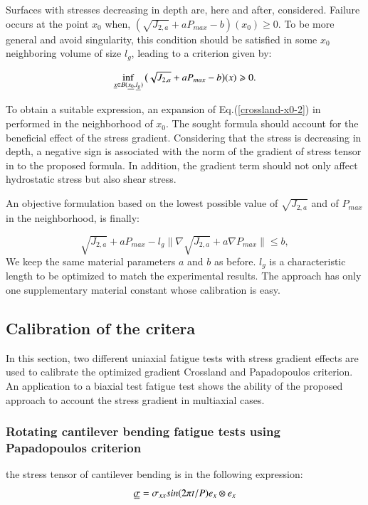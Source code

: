 \documentclass[3p,times,procedia,number]{elsarticle}
\begin{document}
Surfaces with stresses decreasing in depth are, here and after, considered. Failure occurs at the point $x_0$ when,  $(\sqrt{J_{2,a}}+aP_{max}-b)(x_0)\geqslant 0 $. To be more general and avoid singularity, this condition should be satisfied in some $x_0$ neighboring volume of size $l_g$, leading to a criterion given by:

\begin{equation}
\inf\limits_{\uline{x}\in B(\uline{x_0},\uline{l_g})}\big(\sqrt{J_{2,a}}+aP_{max}-b\big)(x)\geqslant 0 .
\label{crossland-x0-2}
\end{equation}

To obtain a suitable expression, an expansion of Eq.(\ref{crossland-x0-2}) in performed in the neighborhood of ${x_0}$. The sought formula should account for the beneficial effect of the stress gradient. Considering that the stress is decreasing in depth, a negative sign is associated with the norm of the gradient of stress tensor in to the proposed formula. In addition, the gradient term should not only affect hydrostatic stress but also shear stress.

An objective formulation based on the lowest possible value of $\sqrt{J_{2,a}}$ and of $P_{max}$ in the neighborhood, is finally:

\begin{equation}
\sqrt{J_{2,a}}+aP_{max}-l_g\parallel{\nabla\sqrt{J_{2,a}}}+a\nabla{P_{max}}\parallel\leqslant b ,
\label{modified Crossland}
\end{equation}
We keep the same material parameters $a$ and $b$ as before. $l_g$ is a characteristic length to be optimized to match the experimental results. The approach has only one supplementary material constant whose calibration is easy.


\subsection{Calibration of the critera}

In this section, two different uniaxial fatigue tests with stress gradient effects are used to calibrate the optimized gradient Crossland  and Papadopoulos criterion. An application to a biaxial test fatigue test shows the ability of the proposed approach to account the stress gradient in multiaxial cases. 
\subsubsection{Rotating cantilever bending fatigue tests using Papadopoulos criterion}  
the stress tensor of cantilever bending is in the following expression:
$$\uuline{\sigma}=\sigma_{xx}sin(2\pi t/P)e_x\otimes e_x$$
\end{document}
